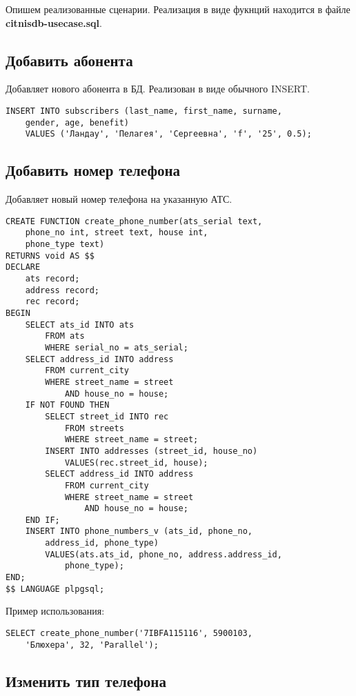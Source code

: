\documentclass{report}
\begin{document}
Опишем реализованные сценарии. Реализация в виде
фукнций находится в файле \textbf{citnisdb-usecase.sql}.

\subsection*{Добавить абонента}

Добавляет нового абонента в БД. Реализован в виде обычного INSERT.

\begin{lstlisting}
INSERT INTO subscribers (last_name, first_name, surname, 
    gender, age, benefit)
	VALUES ('Ландау', 'Пелагея', 'Сергеевна', 'f', '25', 0.5);
\end{lstlisting}

\subsection*{Добавить номер телефона}

Добавляет новый номер телефона на указанную АТС.

\begin{lstlisting}
CREATE FUNCTION create_phone_number(ats_serial text, 
    phone_no int, street text, house int, 
    phone_type text) 
RETURNS void AS $$
DECLARE
    ats record;
    address record;
    rec record;
BEGIN
    SELECT ats_id INTO ats 
        FROM ats 
        WHERE serial_no = ats_serial;
    SELECT address_id INTO address
        FROM current_city
        WHERE street_name = street
            AND house_no = house;
    IF NOT FOUND THEN
        SELECT street_id INTO rec 
            FROM streets 
            WHERE street_name = street;
        INSERT INTO addresses (street_id, house_no)
            VALUES(rec.street_id, house);
        SELECT address_id INTO address
            FROM current_city
            WHERE street_name = street
                AND house_no = house;
    END IF;
    INSERT INTO phone_numbers_v (ats_id, phone_no, 
        address_id, phone_type)
        VALUES(ats.ats_id, phone_no, address.address_id, 
            phone_type);
END;
$$ LANGUAGE plpgsql;
\end{lstlisting}

Пример использования:
\begin{lstlisting}
SELECT create_phone_number('7IBFA115116', 5900103,
    'Блюхера', 32, 'Parallel');
\end{lstlisting}

\subsection*{Изменить тип телефона}
\end{document}
